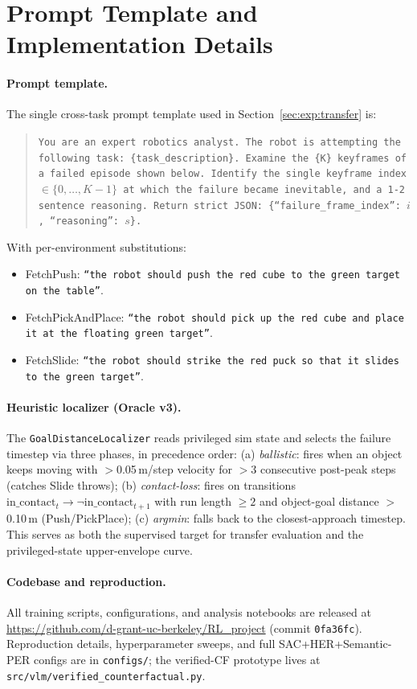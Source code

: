 \documentclass{article}
\begin{document}
\appendix

\section{Prompt Template and Implementation Details}
\label{app:prompts}

\paragraph{Prompt template.}
The single cross-task prompt template used in Section~\ref{sec:exp:transfer} is:

\begin{quote}
\small
\texttt{You are an expert robotics analyst. The robot is attempting the
following task: \{task\_description\}. Examine the \{K\} keyframes of a failed
episode shown below. Identify the single keyframe index $\in\{0,\dots,K\!-\!1\}$
at which the failure became inevitable, and a 1-2 sentence reasoning. Return
strict JSON: \{``failure\_frame\_index'': $i$, ``reasoning'': $s$\}.}
\end{quote}

\noindent
With per-environment substitutions:
\begin{itemize}\itemsep0pt
\item FetchPush: \texttt{``the robot should push the red cube to the green target on the table''}.
\item FetchPickAndPlace: \texttt{``the robot should pick up the red cube and place it at the floating green target''}.
\item FetchSlide: \texttt{``the robot should strike the red puck so that it slides to the green target''}.
\end{itemize}

\paragraph{Heuristic localizer (Oracle v3).}
The \texttt{GoalDistanceLocalizer} reads privileged sim state and selects the
failure timestep via three phases, in precedence order: (a) \emph{ballistic}:
fires when an object keeps moving with $>$0.05\,m/step velocity for $>$3
consecutive post-peak steps (catches Slide throws); (b) \emph{contact-loss}:
fires on transitions $\text{in\_contact}_t \to \neg\text{in\_contact}_{t+1}$
with run length $\ge 2$ and object-goal distance $>$0.10\,m (Push/PickPlace);
(c) \emph{argmin}: falls back to the closest-approach timestep. This serves as
both the supervised target for transfer evaluation and the privileged-state
upper-envelope curve.

\paragraph{Codebase and reproduction.}
All training scripts, configurations, and analysis notebooks are released at
\url{https://github.com/d-grant-uc-berkeley/RL_project} (commit
\texttt{0fa36fc}). Reproduction details, hyperparameter sweeps, and full
SAC+HER+Semantic-PER configs are in \texttt{configs/}; the verified-CF prototype
lives at \texttt{src/vlm/verified\_counterfactual.py}.


\end{document}
